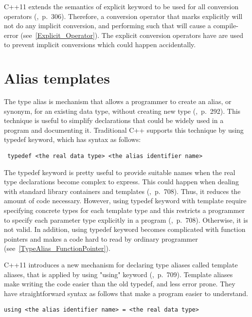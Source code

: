 \documentclass[11pt]{report}
\begin{document}
C++11 extends the semantics of explicit keyword to be used for all conversion operators (\cite{Stroustrup:2012:Cpp11},~p.~306). Therefore, a conversion operator that marks explicitly will not do any implicit conversion, and performing such that will cause a compile-error (see~\ref{Explicit_Operator}). The explicit conversion operators have are used to prevent implicit conversions which could happen accidentally.

\section{Alias templates}
\label{section: Alias templates}
The type alias is mechanism that allows a programmer to create an alias, or synonym, for an existing data type, without creating new type (\cite{Gregorie:professionalcpp},~p.~292). This technique is useful to simplify declarations that could be widely used in a program and documenting it. Traditional C++ supports this technique by using typedef keyword, which has syntax as follows:
\begin{lstlisting}
 typedef <the real data type> <the alias identifier name>
\end{lstlisting}

The typedef keyword is pretty useful to provide suitable names when the real type declarations become complex to express. This could happen when dealing with standard library containers and templates (\cite{Gregorie:professionalcpp},~p.~708). Thus, it reduces the amount of code necessary. However, using typedef keyword with template require specifying concrete types for each template type and this restricts a programmer to specify each parameter type explicitly in a program (\cite{Gregorie:professionalcpp},~p.~708). Otherwise, it is not valid. In addition, using typedef keyword becomes complicated with function pointers and makes a code hard to read by ordinary programmer (see~\ref{TypeAlias_FunctionPointer}).

C++11 introduces a new mechanism for declaring type aliases called template aliases, that is applied by using "using" keyword (\cite{Gregorie:professionalcpp},~p.~709). Template aliases make writing the code easier than the old typedef, and less error prone. They have straightforward syntax as follows that make a program easier to understand.

\begin{lstlisting}
using <the alias identifier name> = <the real data type>
\end{lstlisting}
\end{document}
